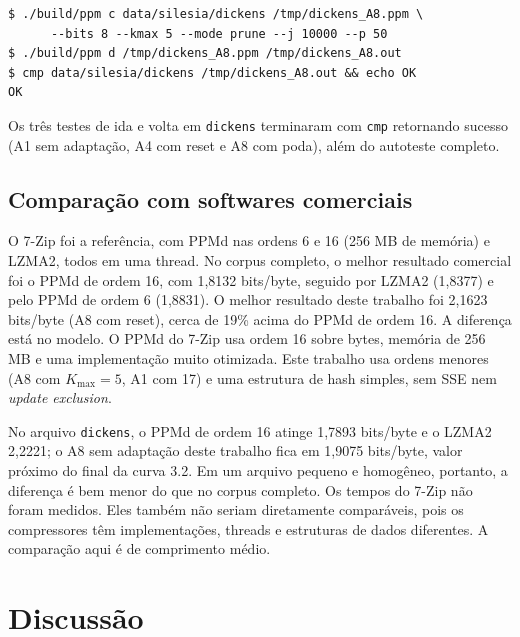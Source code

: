 \documentclass[12pt,a4paper]{article}
\newcommand{\todo}[1]{\textcolor{red}{\textbf{[TODO: #1]}}}
\newcommand{\maybeinput}[1]{%
  \IfFileExists{#1}{}}{\todo{gerar \detokenize{#1}}}}
\begin{document}
\begin{lstlisting}
$ ./build/ppm c data/silesia/dickens /tmp/dickens_A8.ppm \
      --bits 8 --kmax 5 --mode prune --j 10000 --p 50
$ ./build/ppm d /tmp/dickens_A8.ppm /tmp/dickens_A8.out
$ cmp data/silesia/dickens /tmp/dickens_A8.out && echo OK
OK
\end{lstlisting}

Os tr\^es testes de ida e volta em \texttt{dickens} terminaram com \texttt{cmp}
retornando sucesso (A1 sem adapta\c{c}\~ao, A4 com reset e A8 com poda), al\'em do
autoteste completo.

\subsection{Compara\c{c}\~ao com softwares comerciais}
\maybeinput{tables/commercial.tex}

O 7-Zip foi a refer\^encia, com PPMd nas ordens 6 e 16 (256 MB de mem\'oria) e
LZMA2, todos em uma thread. No corpus completo, o melhor resultado comercial foi
o PPMd de ordem 16, com 1,8132 bits/byte, seguido por LZMA2 (1,8377) e pelo PPMd
de ordem 6 (1,8831). O melhor resultado deste trabalho foi 2,1623 bits/byte (A8
com reset), cerca de 19\% acima do PPMd de ordem 16. A diferen\c{c}a est\'a no
modelo. O PPMd do 7-Zip usa ordem 16 sobre bytes, mem\'oria de 256 MB e uma
implementa\c{c}\~ao muito otimizada. Este trabalho usa ordens menores (A8 com
$K_{\max}=5$, A1 com 17) e uma estrutura de hash simples, sem SSE nem
\emph{update exclusion}.

No arquivo \texttt{dickens}, o PPMd de ordem 16 atinge 1,7893 bits/byte e o LZMA2
2,2221; o A8 sem adapta\c{c}\~ao deste trabalho fica em 1,9075 bits/byte, valor
pr\'oximo do final da curva 3.2. Em um arquivo pequeno e homog\^eneo, portanto, a
diferen\c{c}a \'e bem menor do que no corpus completo. Os tempos do 7-Zip n\~ao
foram medidos. Eles tamb\'em n\~ao seriam diretamente compar\'aveis, pois os
compressores t\^em implementa\c{c}\~oes, threads e estruturas de dados diferentes.
A compara\c{c}\~ao aqui \'e de comprimento m\'edio.

\section{Discuss\~ao}
\end{document}
